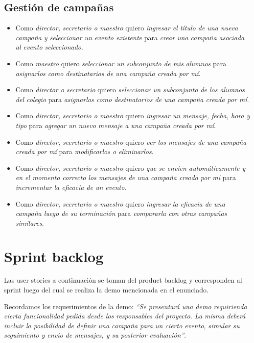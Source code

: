 \documentclass[a4paper, 10pt, twoside]{article}
\newenvironment{stories}{
  \begin{itemize}
}{
  \end{itemize}
}
\newcommand{\story}[3]{
  \item
  Como \emph{#1} quiero \emph{#2} para \emph{#3}.
}
\begin{document}
\subsection{Gestión de campañas}

\begin{stories}
  \story{director, secretario o maestro}
        {ingresar el título de una nueva campaña y seleccionar un evento existente}
        {crear una campaña asociada al evento seleccionado}

  \story{maestro}
        {seleccionar un subconjunto de mis alumnos}
        {asignarlos como destinatarios de una campaña creada por mí}

  \story{director o secretario}
        {seleccionar un subconjunto de los alumnos del colegio}
        {asignarlos como destinatarios de una campaña creada por mí}

  \story{director, secretario o maestro}
        {ingresar un mensaje, fecha, hora y tipo}
        {agregar un nuevo mensaje a una campaña creada por mí}

  \story{director, secretario o maestro}
        {ver los mensajes de una campaña creada por mí}
        {modificarlos o eliminarlos}

  \story{director, secretario o maestro}
        {que se envíen automáticamente y en el momento correcto los mensajes de una campaña creada por mí}
        {incrementar la eficacia de un evento}

  \story{director, secretario o maestro}
        {ingresar la eficacia de una campaña luego de su terminación}
        {compararla con otras campañas similares}
\end{stories}




\section{Sprint backlog}

Las user stories a continuación se toman del product backlog y corresponden al sprint luego del cual se realiza la demo mencionada en el enunciado.

Recordamos los requerimientos de la demo: \emph{``Se presentará una demo requiriendo cierta funcionalidad pedida desde los responsables del proyecto. La misma deberá incluir la posibilidad de definir una campaña para un cierto evento, simular su seguimiento y envío de mensajes, y su posterior evaluación''}.
\end{document}
